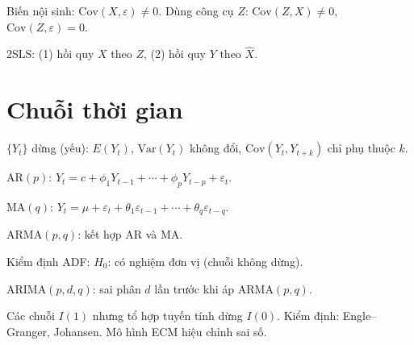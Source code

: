 \documentclass[12pt,a4paper]{article}
\begin{document}
\begin{dinhnghia}[title={Biến công cụ (IV) và 2SLS}]
  Biến nội sinh: $\text{Cov}(X, \varepsilon) \ne 0$. Dùng công cụ $Z$: $\text{Cov}(Z, X) \ne 0$, $\text{Cov}(Z, \varepsilon) = 0$.

  2SLS: (1) hồi quy $X$ theo $Z$, (2) hồi quy $Y$ theo $\hat{X}$.
\end{dinhnghia}

\section{Chuỗi thời gian}

\begin{dinhnghia}[title={Chuỗi dừng}]
  $\{Y_t\}$ dừng (yếu): $E(Y_t)$, $\text{Var}(Y_t)$ không đổi, $\text{Cov}(Y_t, Y_{t+k})$ chỉ phụ thuộc $k$.
\end{dinhnghia}

\begin{dinhnghia}[title={Mô hình ARMA}]
  $\text{AR}(p)$: $Y_t = c + \phi_1 Y_{t-1} + \cdots + \phi_p Y_{t-p} + \varepsilon_t$.

  $\text{MA}(q)$: $Y_t = \mu + \varepsilon_t + \theta_1\varepsilon_{t-1} + \cdots + \theta_q\varepsilon_{t-q}$.

  $\text{ARMA}(p,q)$: kết hợp AR và MA.
\end{dinhnghia}

\begin{dinhnghia}[title={Nghiệm đơn vị và ARIMA}]
  Kiểm định ADF: $H_0$: có nghiệm đơn vị (chuỗi không dừng).

  ARIMA$(p,d,q)$: sai phân $d$ lần trước khi áp ARMA$(p,q)$.
\end{dinhnghia}

\begin{dinhnghia}[title={Đồng liên kết (Cointegration)}]
  Các chuỗi $I(1)$ nhưng tổ hợp tuyến tính dừng $I(0)$. Kiểm định: Engle--Granger, Johansen. Mô hình ECM hiệu chỉnh sai số.
\end{dinhnghia}
\end{document}
